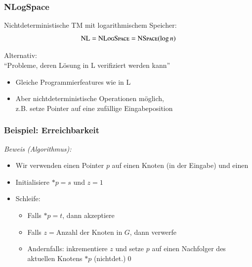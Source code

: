 \documentclass[aspectratio=1610,onlymath]{beamer}
\begin{document}
\begin{frame}\frametitle{NLogSpace}

\alert{Nichtdeterministische TM mit logarithmischem Speicher:}
\[
{\textsc{NL}} = {\textsc{NLogSpace}} = {\textsc{NSpace}}(\log n)
\]

\alert{Alternativ:}\\
"`Probleme, deren Lösung in L verifiziert werden kann"'
\bigskip

\begin{itemize}
\item Gleiche Programmierfeatures wie in L
\item Aber nichtdeterministische Operationen möglich,\\ z.B. setze Pointer auf eine zufällige Eingabeposition
\end{itemize}

\end{frame}

\begin{frame}\frametitle{Beispiel: Erreichbarkeit}

\bigskip\pause

\pause

\emph{Beweis (Algorithmus):}
\begin{itemize}
\item Wir verwenden einen Pointer $p$ auf einen Knoten (in der Eingabe) und einen 
\item Initialisiere $*p=s$ und $z=1$
\item Schleife:
\begin{itemize}
\item Falls $*p=t$, dann akzeptiere
\item Falls $z={}$Anzahl der Knoten in $G$, dann verwerfe
\item Andernfalls: inkrementiere $z$ und setze $p$ auf einen Nachfolger des aktuellen Knotens $*p$ (nichtdet.)\qed
\end{itemize}
\end{itemize}

\end{frame}
\end{document}

